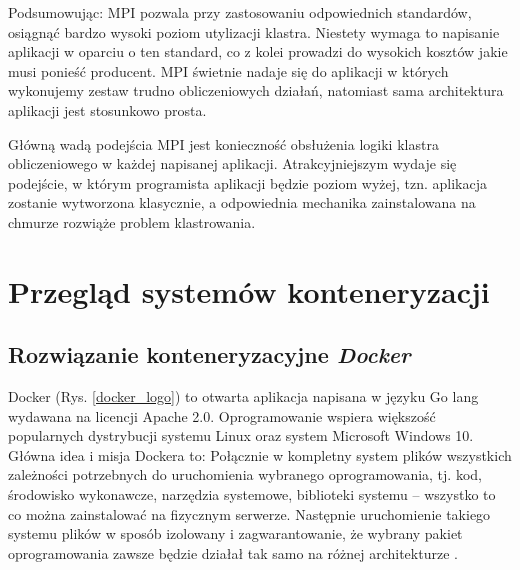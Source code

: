 \documentclass[10pt,a4paper,titlepage,twoside]{report}
\begin{document}
Podsumowując: MPI pozwala przy zastosowaniu odpowiednich standardów, osiągnąć bardzo wysoki poziom utylizacji klastra. Niestety wymaga to napisanie aplikacji w oparciu o ten standard, co z kolei prowadzi do wysokich kosztów jakie musi ponieść producent. MPI świetnie nadaje się do aplikacji w których wykonujemy zestaw trudno obliczeniowych działań, natomiast sama architektura aplikacji jest stosunkowo prosta.

Główną wadą podejścia MPI jest konieczność obsłużenia logiki klastra obliczeniowego w każdej napisanej aplikacji. Atrakcyjniejszym wydaje się podejście, w którym programista aplikacji będzie poziom wyżej, tzn. aplikacja zostanie wytworzona klasycznie, a odpowiednia mechanika zainstalowana na chmurze rozwiąże problem klastrowania.

\section{Przegląd systemów konteneryzacji}
\subsection{Rozwiązanie konteneryzacyjne \textit{Docker}}
\indent \indent Docker (Rys. \ref{docker_logo}) to otwarta aplikacja napisana w języku Go lang wydawana na licencji Apache 2.0. Oprogramowanie wspiera większość popularnych dystrybucji systemu Linux oraz system Microsoft Windows 10. Główna idea i misja Dockera to: Połącznie w kompletny system plików wszystkich zależności potrzebnych do uruchomienia wybranego oprogramowania, tj. kod, środowisko wykonawcze, narzędzia systemowe, biblioteki systemu – wszystko to co można zainstalować na fizycznym serwerze. Następnie uruchomienie takiego systemu plików w sposób izolowany i zagwarantowanie, że wybrany pakiet oprogramowania zawsze będzie działał tak samo na różnej architekturze \cite{ad27}.
\end{document}
